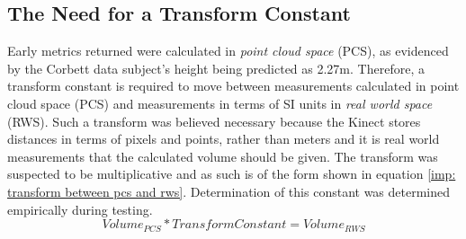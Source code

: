\subsection{The Need for a Transform Constant}
Early metrics returned were calculated in \emph{point cloud space} (PCS), as evidenced by the Corbett data subject's height being predicted as 2.27m. Therefore, a transform constant is required to move between measurements calculated in point cloud space (PCS) and measurements in terms of SI units in \emph{real world space} (RWS). Such a transform was believed necessary because the Kinect stores distances in terms of pixels and points, rather than meters and it is real world measurements that the calculated volume should be given. The transform was suspected to be multiplicative and as such is of the form shown in equation \ref{imp: transform between pcs and rws}. Determination of this constant was determined empirically during testing.\\

\begin{equation}
Volume_{PCS} * Transform Constant = Volume_{RWS}
\label{imp: transform between pcs and rws}
\end{equation}\\